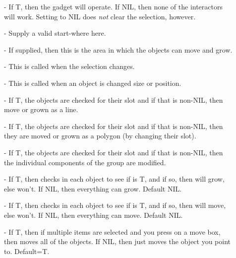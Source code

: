 \begin{description}
\item[]     - If T, then the gadget will operate.  If NIL, then
                    none of the interactors will work.  Setting to NIL does
                    {\it not} clear the selection, however.

\item[]     - Supply a valid start-where here.

\item[]     - If supplied, then this is the area in which the
 			 objects can move and grow.

\item[]     - This is called when the selection changes.

\item[]     - This is called when an object is changed size or
                           position.

\item[]     - If T, the objects are checked for their  slot
                      and if that is non-NIL, then move or grown as a line.

\item[]     - If T, the objects are checked for their
                          slot and if that is non-NIL, then
                         they are moved or grown as a polygon (by changing
                         their  slot).

\item[]     - If T, the objects are checked for their 
                       slot and if that is non-NIL, then the individual
                       components of the group are modified.

\item[]     - If T, then checks in each object to see if 
                        is T, and if so, then will grow, else won't.
                        If NIL, then everything can grow.  Default NIL.

\item[]     - If T, then checks in each object to see if 
                        is T, and if so, then will move, else won't.  If NIL,
                        then everything can move.  Default NIL.

\item[]     - If T, then if multiple items are selected and you
 			press on a move box, then moves all of the objects.
 			If NIL, then just moves the object you point to.
 			Default=T.


\end{description}
